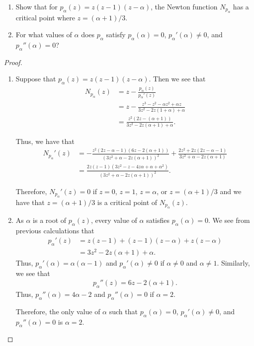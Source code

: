 \begin{problem}{6}
  \begin{enumerate}
    \item Show that for $p_\alpha(z) = z(z-1)(z-\alpha)$, the Newton function $N_{p_\alpha}$
      has a critical point where $z=(\alpha + 1)/3$.
    \item For what values of $\alpha$ does $p_\alpha$ satisfy $p_\alpha(\alpha) = 0$, $p_\alpha'(\alpha) \neq 0$,
      and $p_\alpha''(\alpha) = 0$?
  \end{enumerate}
\end{problem}

\begin{proof}
  \begin{enumerate}
    \item Suppose that $p_\alpha(z) = z(z-1)(z-\alpha)$. Then we see that
      \begin{align*}
        N_{p_\alpha}(z) &= z - \frac{p_\alpha(z)}{p_\alpha'(z)} \\
        &= z - \frac{z^3 -z^2 - \alpha z^2 + \alpha z}{3 z^2 -2z(1 + \alpha) + \alpha} \\
        &= \frac{z^2(2z-(\alpha+1))}{3z^2- 2z(\alpha + 1)+\alpha}.
      \end{align*}

      Thus, we have that
      \begin{align*}
        N_{p_\alpha}'(z)
        &= -\frac{z^2(2z - \alpha - 1)(6z - 2(\alpha + 1))}{(3z^2+\alpha-2z(\alpha + 1))^2}
        + \frac{2z^2 + 2z(2z -\alpha - 1)}{3z^2 + \alpha -2z(\alpha + 1)} \\
        &= \frac{2z(z-1)(3z^2-z-4z\alpha+\alpha+\alpha^2)}{(3z^2+\alpha-2z(\alpha + 1))^2}.
      \end{align*}

      Therefore, $N_{p_\alpha}'(z) = 0$ if $z=0$, $z=1$, $z=\alpha$, or $z=(\alpha+1)/3$
      and we have that $z=(\alpha+1)/3$ is a critical point of $N_{p_\alpha}(z)$.

    \item As $\alpha$ is a root of $p_\alpha(z)$, every value of $\alpha$ satisfies $p_\alpha(\alpha) = 0$.
      We see from previous calculations that
      \begin{align*}
        p_\alpha'(z) &= z(z-1) + (z-1) (z - \alpha) + z (z - \alpha)\\
        &= 3z^2 -2z(\alpha+1) + \alpha.
      \end{align*}
      Thus, $p_\alpha'(\alpha) = \alpha(\alpha-1)$ and $p_\alpha'(\alpha)\neq 0$ if $\alpha \neq 0$ and $\alpha \neq 1$.
      Similarly, we see that
      \begin{align*}
        p_\alpha''(z) = 6z - 2(\alpha + 1).
      \end{align*}
      Thus, $p_\alpha''(\alpha) = 4\alpha -2$ and $p_\alpha''(\alpha) = 0$ if $\alpha = 2$.

      Therefore, the only value of $\alpha$ such that $p_\alpha(\alpha) = 0$, $p_\alpha'(\alpha) \neq 0$,
      and $p_\alpha''(\alpha) = 0$ is $\alpha = 2$.

  \end{enumerate}
\end{proof}
\newpage
